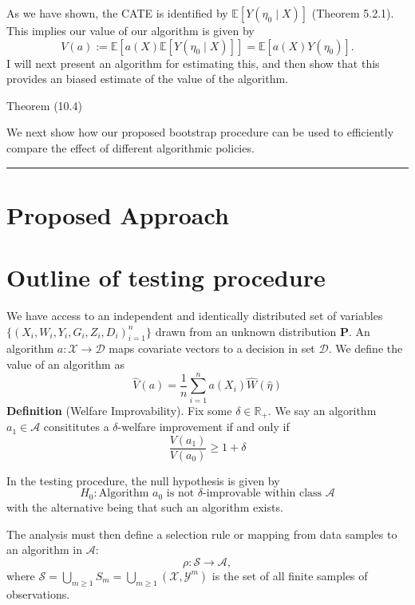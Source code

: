 \documentclass[
]{article}
\begin{document}
As we have shown, the CATE is identified by
\(\mathbb{E}[Y(\eta_{0} \mid X)]\) (Theorem 5.2.1). This implies our
value of our algorithm is given by \[
V(a) := \mathbb{E}[a(X)\mathbb{E}[Y(\eta_{0} \mid X)]] = \mathbb{E}[a(X)Y(\eta_{0})].
\] I will next present an algorithm for estimating this, and then show
that this provides an biased estimate of the value of the algorithm.

Theorem (10.4)

We next show how our proposed bootstrap procedure can be used to
efficiently compare the effect of different algorithmic policies.

\begin{center}\rule{0.5\linewidth}{0.5pt}\end{center}

\section{Proposed Approach}\label{proposed-approach}

\section{Outline of testing
procedure}\label{outline-of-testing-procedure}

We have access to an independent and identically distributed set of
variables \(\{ (X_{i}, W_{i}, Y_{i}, G_{i}, Z_{i}, D_{i})_{i=1}^n \}\)
drawn from an unknown distribution \(\mathbf{P}\). An algorithm
\(a: \mathcal{X} \to \mathcal{D}\) maps covariate vectors to a decision
in set \(\mathcal{D}\). We define the value of an algorithm as \[
\hat{V}(a) = \frac{1}{n}\sum_{i=1}^n a(X_{i}) \hat{W}(\hat{\eta})
\] \textbf{Definition} (Welfare Improvability). Fix some
\(\delta \in \mathbb{R}_{+}\). We say an algorithm
\(a_{1} \in \mathcal{A}\) consititutes a \(\delta\)-welfare improvement
if and only if \[
\frac{V(a_{1})}{V(a_{0})} \geq 1 + \delta
\]

In the testing procedure, the null hypothesis is given by \[
H_{0}: \text{Algorithm $a_{0}$ is not $\delta$}\text{-improvable within class } \mathcal{A}
\] with the alternative being that such an algorithm exists.

The analysis must then define a selection rule or mapping from data
samples to an algorithm in \(\mathcal{A}\): \[
\rho: \mathcal{S} \to \mathcal{A},
\] where
\(\mathcal{S} = \bigcup_{m \geq 1}S_{m} = \bigcup_{m\geq 1}(\mathcal{X, Y}^m)\)
is the set of all finite samples of observations.
\end{document}
